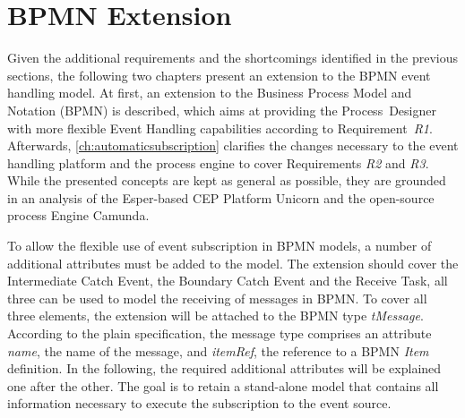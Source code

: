 \section{BPMN Extension}\label{ch:bpmnx}


Given the additional requirements and the shortcomings identified in the previous sections, the following two chapters present an extension to the BPMN event handling model.
At first, an extension to the Business Process Model and Notation (BPMN) is described, which aims at providing the Process~Designer with more flexible Event Handling capabilities according to Requirement~\textit{R1}.
Afterwards, \autoref{ch:automaticsubscription} clarifies the changes necessary to the event handling platform and the process engine to cover Requirements \textit{R2} and \textit{R3}.
While the presented concepts are kept as general as possible, they are grounded in an analysis of the Esper-based CEP Platform Unicorn and the open-source process Engine Camunda.

To allow the flexible use of event subscription in BPMN models, a number of additional attributes must be added to the model. 
The extension should cover the Intermediate Catch Event, the Boundary Catch Event and the Receive Task, all three can be used to model the receiving of messages in BPMN.
To cover all three elements, the extension will be attached to the BPMN type \textit{tMessage}. 
According to the plain specification, the message type comprises an attribute \textit{name}, the name of the message, and \textit{itemRef}, the reference to a BPMN \textit{Item} definition. 
In the following, the required additional attributes will be explained one after the other. The goal is to retain a stand-alone model that contains all information necessary to execute the subscription to the event source.


